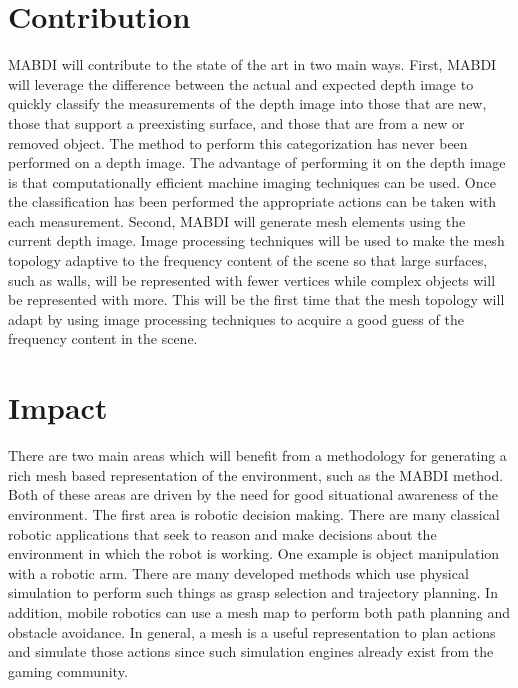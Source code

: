 \documentclass[12pt]{article}
\begin{document}
\section{Contribution}
\label{ch:contribution}

MABDI will contribute to the state of the art in two main ways. First,
MABDI will leverage the difference between the actual and expected depth
image to quickly classify the measurements of the depth image into those
that are new, those that support a preexisting surface, and those that
are from a new or removed object. The method to perform this categorization
has never been performed on a depth image. The advantage of performing it
on the depth image is that computationally efficient machine imaging
techniques can be used. Once the classification has been performed the
appropriate actions can be taken with each measurement. Second, MABDI will
generate mesh elements using the current depth image. Image processing
techniques will be used to make the mesh topology adaptive to the frequency
content of the scene so that large surfaces, such as walls, will be
represented with fewer vertices while complex objects will be represented
with more. This will be the first time that the mesh topology will adapt
by using image processing techniques to acquire a good guess of the
frequency content in the scene. 

\section{Impact}
\label{ch:impact}

There are two main areas which will benefit from a methodology for
generating a rich mesh based representation of the environment, such as the
MABDI method. Both of these areas are driven by the need for good
situational awareness of the environment. The first area is robotic
decision making. There are many classical robotic applications that seek
to reason and make decisions about the environment in which the robot is
working. One example is object manipulation with a robotic arm. There are
many developed methods which use physical simulation to perform such things
as grasp selection and trajectory planning. In addition, mobile robotics
can use a mesh map to perform both path planning and obstacle avoidance. In
general, a mesh is a useful representation to plan actions and simulate
those actions since such simulation engines already exist from the gaming
community. 
\end{document}
